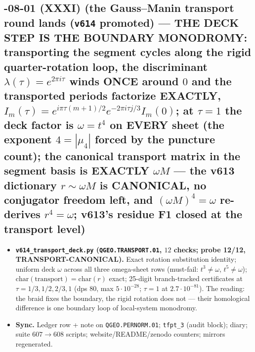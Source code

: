 \documentclass[11pt]{article}
\begin{document}
\subsection*{-08-01 (XXXI) (the Gauss--Manin transport round lands (\texttt{v614} promoted) --- THE DECK STEP IS THE BOUNDARY MONODROMY: transporting the segment cycles along the rigid quarter-rotation loop, the discriminant $\lambda(\tau)=e^{2\pi i\tau}$ winds ONCE around $0$ and the transported periods factorize EXACTLY, $I_m(\tau)=e^{i\pi\tau(m+1)/2}e^{-2\pi i\tau j/3}I_m(0)$; at $\tau=1$ the deck factor is $\omega=t^4$ on EVERY sheet (the exponent $4=|\mu_4|$ forced by the puncture count); the canonical transport matrix in the segment basis is EXACTLY $\omega M$ --- the v613 dictionary $r\sim\omega M$ is CANONICAL, no conjugator freedom left, and $(\omega M)^4=\omega$ re-derives $r^4=\omega$; v613's residue F1 closed at the transport level)}
\begin{itemize}[leftmargin=1.5em]
\item \textbf{\texttt{v614\_transport\_deck.py} (\texttt{QGEO.TRANSPORT.01}, $12$ checks;
probe 12/12, TRANSPORT-CANONICAL).} Exact rotation substitution identity; uniform deck
$\omega$ across all three omega-sheet rows (must-fail: $t^3\ne\omega$, $t^5\ne\omega$);
$\mathrm{char}(\mathrm{transport})=\mathrm{char}(r)$ exact; 25-digit branch-tracked
certificates at $\tau=1/3,1/2,2/3,1$ (dps $80$, max $5{\cdot}10^{-28}$; $\tau=1$ at
$2.7{\cdot}10^{-81}$).  The reading: the braid fixes the boundary, the rigid rotation
does not --- their homological difference is one boundary loop of local-system
monodromy.
\item \textbf{Sync.} Ledger row + note on \texttt{QGEO.PERNORM.01}; \texttt{tfpt\_3}
(audit block); diary; suite $607\to608$ scripts; website/README/zenodo counters;
mirrors regenerated.
\end{itemize}
\end{document}
